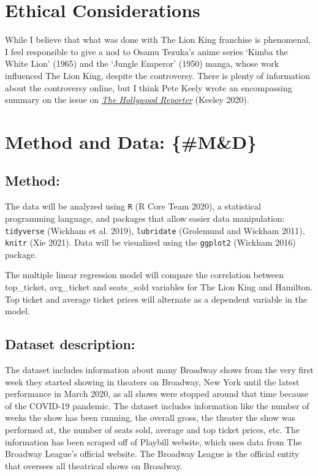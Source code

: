 \documentclass[
]{article}
\begin{document}
\hypertarget{ethical-considerations}{%
\section{Ethical Considerations}\label{ethical-considerations}}

While I believe that what was done with The Lion King franchise is phenomenal, I feel responsible to give a nod to Osamu Tezuka's anime series `Kimba the White Lion' (1965) and the `Jungle Emperor' (1950) manga, whose work influenced The Lion King, despite the controversy. There is plenty of information about the controversy online, but I think Pete Keely wrote an encompassing summary on the issue on \href{https://www.hollywoodreporter.com/heat-vision/lion-king-kimba-white-lion-does-disney-need-come-clean-1225822}{\emph{The Hollywood Reporter}} (Keeley 2020).

\hypertarget{method-and-data-md}{%
\section{Method and Data: \{\#M\&D\}}\label{method-and-data-md}}

\hypertarget{method}{%
\subsection{Method:}\label{method}}

The data will be analyzed using \texttt{R} (R Core Team 2020), a statistical programming language, and packages that allow easier data manipulation: \texttt{tidyverse} (Wickham et al. 2019), \texttt{lubridate} (Grolemund and Wickham 2011), \texttt{knitr} (Xie 2021). Data will be visualized using the \texttt{ggplot2} (Wickham 2016) package.

The multiple linear regression model will compare the correlation between top\_ticket, avg\_ticket and seats\_sold variables for The Lion King and Hamilton. Top ticket and average ticket prices will alternate as a dependent variable in the model.

\hypertarget{dataset-description}{%
\subsection{Dataset description:}\label{dataset-description}}

The dataset includes information about many Broadway shows from the very first week they started showing in theaters on Broadway, New York until the latest performance in March 2020, as all shows were stopped around that time because of the COVID-19 pandemic. The dataset includes information like the number of weeks the show has been running, the overall gross, the theater the show was performed at, the number of seats sold, average and top ticket prices, etc. The information has been scraped off of Playbill website, which uses data from The Broadway League's official website. The Broadway League is the official entity that oversees all theatrical shows on Broadway.
\end{document}
